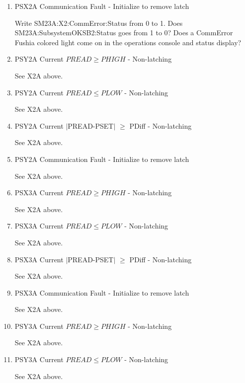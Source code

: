 \documentclass[11pt]{book}		%
\begin{document}
\begin{enumerate}
 \item PSX2A Communication Fault - Initialize to remove latch

\color{red}
Write SM23A:X2:CommError:Status from 0 to 1. Does SM23A:SubsystemOKSB2:Status goes from 1 to 0? Does a CommError Fushia colored light come on in the operations console and status display?
\color{black}

 \item PSY2A Current $PREAD \geq PHIGH$ - Non-latching

\color{red}
See X2A above.
\color{black}


 \item PSY2A Current $PREAD \leq PLOW$ - Non-latching

\color{red}
See X2A above.
\color{black}

 \item PSY2A Current $\mid$PREAD-PSET$\mid$  $\geq$ PDiff - Non-latching

\color{red}
See X2A above.
\color{black}

 \item PSY2A Communication Fault - Initialize to remove latch

\color{red}
See X2A above.
\color{black}

 \item PSX3A Current $PREAD \geq PHIGH$ - Non-latching

\color{red}
See X2A above.
\color{black}

 \item PSX3A Current $PREAD \leq PLOW$ - Non-latching

\color{red}
See X2A above.
\color{black}

 \item PSX3A Current $\mid$PREAD-PSET$\mid$  $\geq$ PDiff - Non-latching

\color{red}
See X2A above.
\color{black}

 \item PSX3A Communication Fault - Initialize to remove latch

\color{red}
See X2A above.
\color{black}

 \item PSY3A Current $PREAD \geq PHIGH$ - Non-latching

\color{red}
See X2A above.
\color{black}

 \item PSY3A Current $PREAD \leq PLOW$ - Non-latching

\color{red}
See X2A above.
\color{black}


\end{enumerate}
\end{document}
